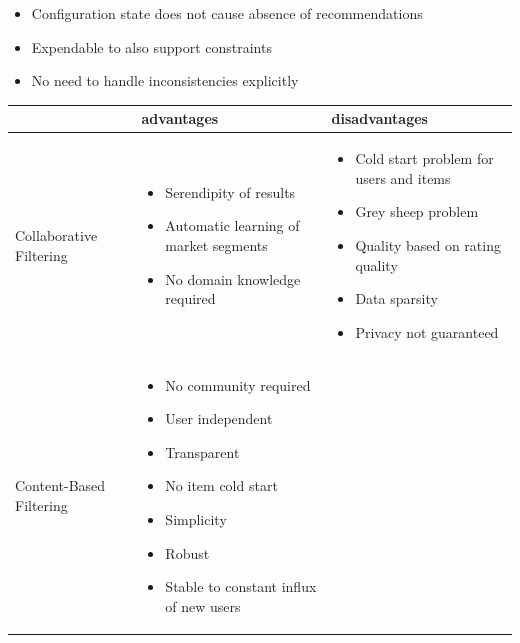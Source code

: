 \begin{itemize}
    \item Configuration state does not cause absence of recommendations
    \item Expendable to also support constraints 
    \item No need to handle inconsistencies explicitly
\end{itemize}


\begin{table}
    \begin{center}
        \begin{tabularx}{\columnwidth}{X|X|X}
            & advantages & disadvantages \\
            \hline
            Collaborative Filtering 
            &   \begin{itemize}
                    \item Serendipity of results 
                    \item Automatic learning of market segments
                    \item No domain knowledge required
                \end{itemize}
            &   \begin{itemize}
                    \item Cold start problem for users and items
                    \item Grey sheep problem
                    \item Quality based on rating quality
                    \item Data sparsity
                    \item Privacy not guaranteed
                \end{itemize} \\
            \hline
            Content-Based Filtering 
            &   \begin{itemize}
                    \item No community required 
                    \item User independent
                    \item Transparent
                    \item No item cold start
                    \item Simplicity
                    \item Robust
                    \item Stable to constant influx of new users
                \end{itemize}

\end{tabularx}
\end{center}
\end{table}
